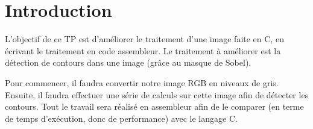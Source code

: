 \chapter{Introduction}

L'objectif de ce TP est d'améliorer le traitement d'une image faite en C, en écrivant le traitement en code assembleur. Le traitement à améliorer est la détection de contours dans une image (grâce au masque de Sobel).

\medskip

Pour commencer, il faudra convertir notre image RGB en niveaux de gris. Ensuite, il faudra effectuer une série de calculs sur cette image afin de détecter les contours. Tout le travail sera réalisé en assembleur afin de le comparer (en terme de temps d'exécution, donc de performance) avec le langage C.